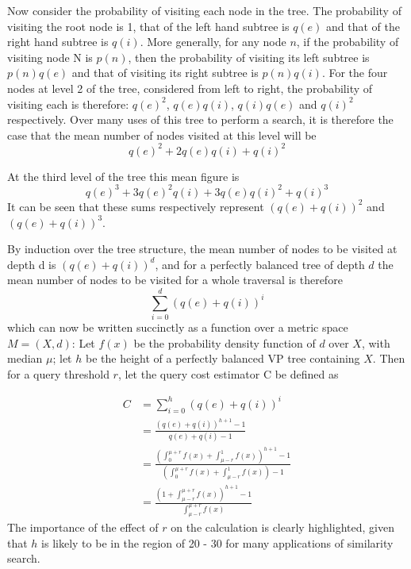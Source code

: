 Now consider the probability of visiting each node in the tree. The probability of visiting the root node is 1, that of the left hand subtree is $q(e)$ and that of the right hand subtree is $q(i)$. More generally, for any node $n$, if the probability of visiting node N is $p(n)$, then the probability of visiting its left subtree is $p(n)q(e)$ and that of visiting its right subtree is $p(n)q(i)$.
For the four nodes at level 2 of the tree, considered from left to right, the probability of visiting each is therefore: $q(e)^2$, $q(e)q(i)$, $q(i)q(e)$ and $q(i)^2$ respectively. Over many uses of this tree to perform a search, it is therefore the case that the mean number of nodes visited at this level will be 
\begin{equation}
q(e)^2 + 2q(e)q(i) + q(i)^2
\end{equation}

At the third level of the tree this mean figure is 
\begin{equation}
q(e)^3 + 3q(e)^2q(i) +3q(e)q(i)^2 + q(i)^3
\end{equation}
It can be seen that these sums respectively represent $(q(e) + q(i))^2$  and $(q(e) + q(i))^3$.

By induction over the tree structure, the mean number of nodes to be visited at depth d is $(q(e) + q(i))^d$, and for a perfectly balanced tree of depth $d$ the mean number of nodes to be visited for a whole traversal is therefore
\begin{equation}
	\sum_{i=0}^d (q(e) + q(i))^i
\end{equation}
which can now be written succinctly as a function over a metric space $M = (X, d)$:
Let $f(x)$ be the probability density function of $d$ over $X$, with median $\mu$;  let $h$ be the height of a perfectly balanced VP tree containing $X$. Then for a query threshold $r$, let the query cost estimator C be defined as

\begin{align}
	C & = \sum_{i = 0}^h (q(e) + q(i))^i\\
	  & = \frac{(q(e) + q(i))^{h+1} - 1}{q(e) + q(i) - 1}\\
	  & = \frac{\left( \int_0^{\mu+r} f(x) + \int_{\mu - r}^1 f(x) \right)^{h+1} - 1}{\left( \int_0^{\mu+r} f(x) + \int_{\mu - r}^1 f(x) \right) - 1}\\	  
	  & = \frac{\left(1 + \int_{\mu - r}^{\mu+r} f(x)  \right)^{h+1} - 1}{\int_{\mu - r}^{\mu+r} f(x)}
\end{align}
The importance of the effect of $r$ on the calculation is clearly highlighted, given that $h$ is likely to be in the region of 20 - 30 for many applications of similarity search.

